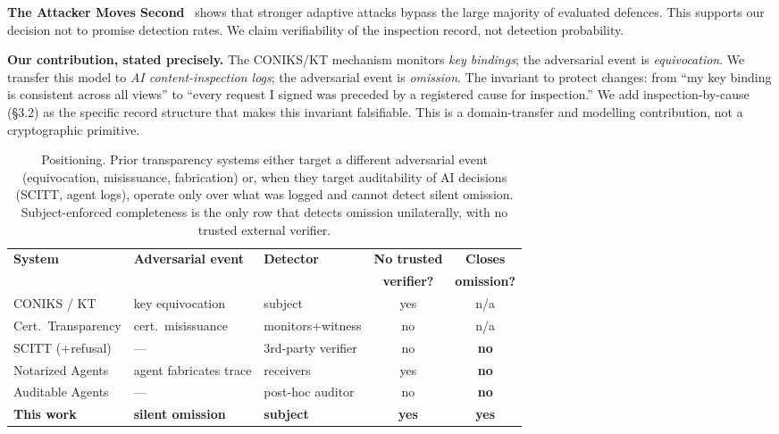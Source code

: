 \documentclass[11pt,a4paper]{article}
\newcommand{\term}[1]{\emph{#1}}
\begin{document}
\textbf{The Attacker Moves Second}~\cite{attacker2024} shows that stronger adaptive
attacks bypass the large majority of evaluated defences. This supports our decision not
to promise detection rates. We claim verifiability of the inspection record, not
detection probability.

\textbf{Our contribution, stated precisely.} The CONIKS/KT mechanism monitors
\term{key bindings}; the adversarial event is \term{equivocation}. We transfer this
model to \term{AI content-inspection logs}; the adversarial event is \term{omission}.
The invariant to protect changes: from ``my key binding is consistent across all views''
to ``every request I signed was preceded by a registered cause for inspection.'' We add
inspection-by-cause (\S3.2) as the specific record structure that makes this invariant
falsifiable. This is a domain-transfer and modelling contribution, not a cryptographic
primitive.

\begin{table}[h]
\centering
\small
\renewcommand{\arraystretch}{1.2}
\begin{tabular}{@{}lllcc@{}}
\toprule
\textbf{System} & \textbf{Adversarial event} & \textbf{Detector} & \textbf{No trusted} & \textbf{Closes} \\
                &                            &                   & \textbf{verifier?} & \textbf{omission?} \\
\midrule
CONIKS / KT          & key equivocation        & subject            & yes & n/a \\
Cert.\ Transparency  & cert.\ misissuance      & monitors+witness   & no  & n/a \\
SCITT (+refusal)     & ---                     & 3rd-party verifier & no  & \textbf{no} \\
Notarized Agents     & agent fabricates trace  & receivers          & yes & \textbf{no} \\
Auditable Agents     & ---                     & post-hoc auditor   & no  & \textbf{no} \\
\textbf{This work}   & \textbf{silent omission}& \textbf{subject}   & \textbf{yes} & \textbf{yes} \\
\bottomrule
\end{tabular}
\caption{Positioning. Prior transparency systems either target a different
adversarial event (equivocation, misissuance, fabrication) or, when they target
auditability of AI decisions (SCITT, agent logs), operate only over what was
logged and cannot detect silent omission. Subject-enforced completeness is the
only row that detects omission unilaterally, with no trusted external verifier.}
\end{table}
\end{document}
